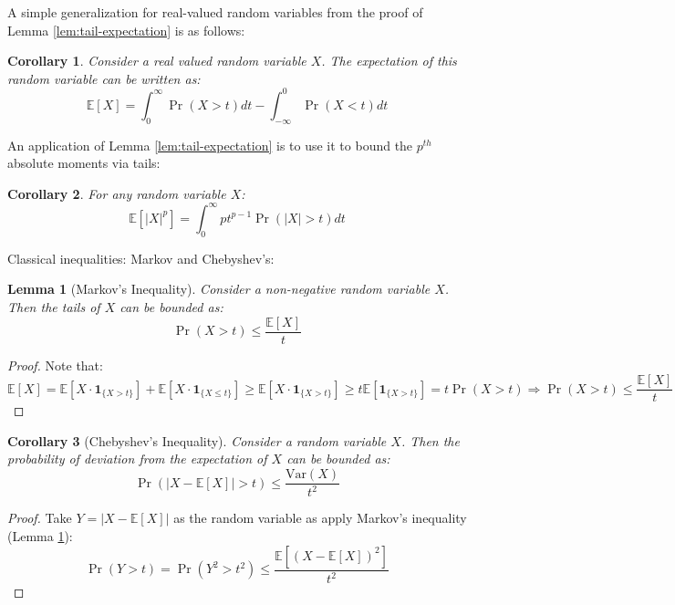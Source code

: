 \documentclass{article}
\newtheorem{corollary}{Corollary}[subsection]
\newtheorem{lemma}{Lemma}[subsection]
\theoremstyle{remark}
\newcommand{\Exp}{\mathbb{E}}
\newcommand{\Var}{\mathrm{Var}}
\newcommand{\indic}[1]{\mathbf{1}_{\{#1\}}}
\begin{document}
A simple generalization for real-valued random variables from the proof of Lemma \ref{lem:tail-expectation} is as follows:
\begin{corollary}
Consider a real valued random variable \(X\). The expectation of this random variable can be written as:
\begin{equation*}
\Exp[X] = \int_{0}^{\infty} \Pr(X > t) dt - \int_{-\infty}^{0} \Pr(X < t) dt
\end{equation*}
\end{corollary}

An application of Lemma \ref{lem:tail-expectation} is to use it to bound the \(p^{th}\) absolute moments via tails:
\begin{corollary}
\label{cor:p-abs-moment}
For any random variable \(X\):
\begin{equation*}
\Exp\left[|X|^{p}\right] = \int_{0}^{\infty} pt^{p-1} \Pr(|X| > t) dt
\end{equation*}
\end{corollary}

Classical inequalities: Markov and Chebyshev's:
\begin{lemma}[Markov's Inequality]
\label{lem:markov}
Consider a non-negative random variable \(X\). Then the tails of \(X\) can be bounded as:
\begin{equation*}
\Pr(X > t) \leq \frac{\Exp[X]}{t}
\end{equation*}
\end{lemma}

\begin{proof}
Note that:
\begin{equation*}
\Exp[X] = \Exp[X \cdot \indic{X > t}] + \Exp[X \cdot \indic{X \leq t}] \geq \Exp[X \cdot \indic{X > t}] \geq t \Exp[\indic{X > t}] = t \Pr(X > t) \Rightarrow \Pr(X > t) \leq \frac{\Exp[X]}{t}
\end{equation*}
\end{proof}

\begin{corollary}[Chebyshev's Inequality]
Consider a random variable \(X\). Then the probability of deviation from the expectation of \(X\) can be bounded as:
\begin{equation*}
\Pr(|X - \Exp[X]| > t) \leq \frac{\Var(X)}{t^{2}}
\end{equation*}
\end{corollary}

\begin{proof}
Take \(Y = |X - \Exp[X]|\) as the random variable as apply Markov's inequality (Lemma \ref{lem:markov}):
\begin{equation*}
\Pr(Y > t) = \Pr(Y^{2} > t^{2}) \leq \frac{\Exp[(X - \Exp[X])^{2}]}{t^{2}}
\end{equation*}
\end{proof}
\end{document}
